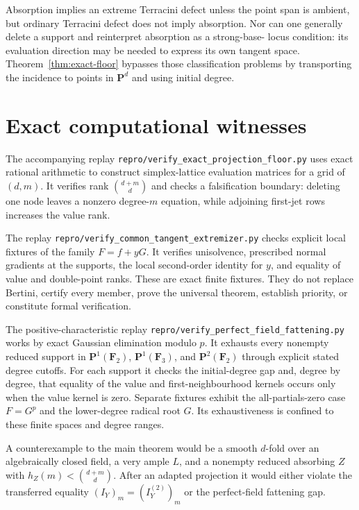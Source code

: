 \documentclass[11pt]{article}
\newcommand{\PP}{\mathbf P}
\begin{document}
Absorption implies an extreme Terracini defect unless the point span is
ambient, but ordinary Terracini defect does not imply absorption.  Nor can
one generally delete a support and reinterpret absorption as a strong-base-
locus condition: its evaluation direction may be needed to express its own
tangent space.  Theorem~\ref{thm:exact-floor} bypasses those classification
problems by transporting the incidence to points in $\PP^d$ and using initial
degree.

\section{Exact computational witnesses}\label{sec:replay}

The accompanying replay
\texttt{repro/verify\_exact\_projection\_floor.py} uses exact rational
arithmetic to construct simplex-lattice evaluation matrices for a grid of
$(d,m)$.  It verifies rank $\binom{d+m}{d}$ and checks a falsification
boundary: deleting one node leaves a nonzero degree-$m$ equation, while
adjoining first-jet rows increases the value rank.

The replay
\texttt{repro/verify\_common\_tangent\_extremizer.py} checks explicit local
fixtures of the family $F=f+yG$.  It verifies unisolvence, prescribed normal
gradients at the supports, the local second-order identity for $y$, and
equality of value and double-point ranks.  These are exact finite fixtures.
They do not replace Bertini, certify every member, prove the universal
theorem, establish priority, or constitute formal verification.

The positive-characteristic replay
\texttt{repro/verify\_perfect\_field\_fattening.py} works by exact Gaussian
elimination modulo $p$.  It exhausts every nonempty reduced support in
$\PP^1(\mathbf F_2)$, $\PP^1(\mathbf F_3)$, and
$\PP^2(\mathbf F_2)$ through explicit stated degree cutoffs.  For each
support it checks the initial-degree gap and, degree by degree, that equality
of the value and first-neighbourhood kernels occurs only when the value kernel
is zero.  Separate fixtures exhibit the all-partials-zero case $F=G^p$ and
the lower-degree radical root $G$.  Its exhaustiveness is confined to these
finite spaces and degree ranges.

A counterexample to the main theorem would be a smooth $d$-fold over an
algebraically closed field, a very ample $L$, and a nonempty reduced absorbing $Z$ with
$h_Z(m)<\binom{d+m}{d}$.  After an adapted projection it would either violate
the transferred equality $(I_Y)_m=(I_Y^{(2)})_m$ or the perfect-field
fattening gap.
\end{document}
